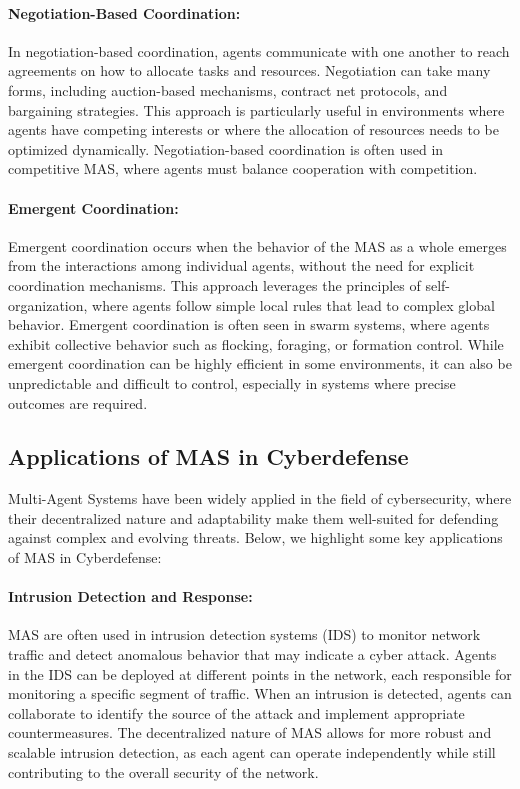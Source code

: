 \paragraph{Negotiation-Based Coordination:}
In negotiation-based coordination, agents communicate with one another to reach agreements on how to allocate tasks and resources. Negotiation can take many forms, including auction-based mechanisms, contract net protocols, and bargaining strategies. This approach is particularly useful in environments where agents have competing interests or where the allocation of resources needs to be optimized dynamically. Negotiation-based coordination is often used in competitive MAS, where agents must balance cooperation with competition.

\paragraph{Emergent Coordination:}
Emergent coordination occurs when the behavior of the MAS as a whole emerges from the interactions among individual agents, without the need for explicit coordination mechanisms. This approach leverages the principles of self-organization, where agents follow simple local rules that lead to complex global behavior. Emergent coordination is often seen in swarm systems, where agents exhibit collective behavior such as flocking, foraging, or formation control. While emergent coordination can be highly efficient in some environments, it can also be unpredictable and difficult to control, especially in systems where precise outcomes are required.

\subsection{Applications of MAS in Cyberdefense}

Multi-Agent Systems have been widely applied in the field of cybersecurity, where their decentralized nature and adaptability make them well-suited for defending against complex and evolving threats. Below, we highlight some key applications of MAS in Cyberdefense:

\paragraph{Intrusion Detection and Response:}
MAS are often used in intrusion detection systems (IDS) to monitor network traffic and detect anomalous behavior that may indicate a cyber attack. Agents in the IDS can be deployed at different points in the network, each responsible for monitoring a specific segment of traffic. When an intrusion is detected, agents can collaborate to identify the source of the attack and implement appropriate countermeasures. The decentralized nature of MAS allows for more robust and scalable intrusion detection, as each agent can operate independently while still contributing to the overall security of the network.

